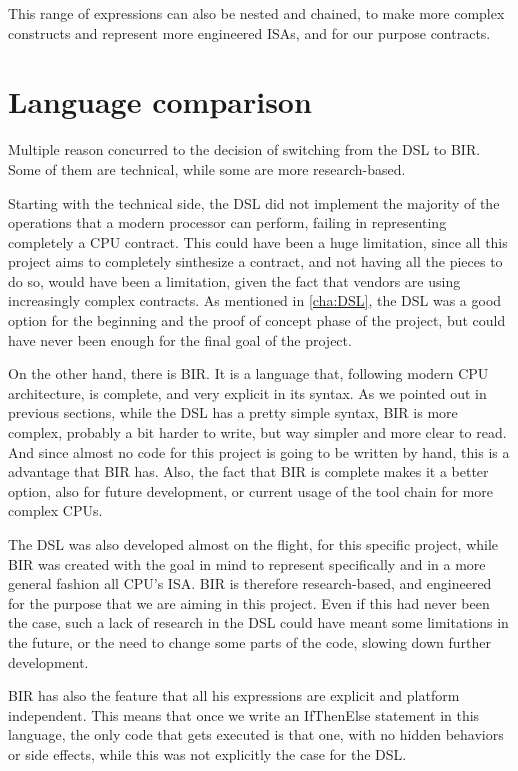 This range of expressions can also be nested and chained, to make more complex
constructs and represent more engineered ISAs, and for our purpose contracts.

\section{Language comparison}
\label{cha:Language comparison} Multiple reason concurred to the decision of switching
from the DSL to BIR. Some of them are technical, while some are more research-based.

Starting with the technical side, the DSL did not implement the majority of the
operations that a modern processor can perform, failing in representing completely
a CPU contract. This could have been a huge limitation, since all this project aims
to completely sinthesize a contract, and not having all the pieces to do so, would
have been a limitation, given the fact that vendors are using increasingly
complex contracts. As mentioned in \cref{cha:DSL}, the DSL was a good option for
the beginning and the proof of concept phase of the project, but could have never
been enough for the final goal of the project.

On the other hand, there is BIR. It is a language that, following modern CPU
architecture, is complete, and very explicit in its syntax. As we pointed out in
previous sections, while the DSL has a pretty simple syntax, BIR is more complex,
probably a bit harder to write, but way simpler and more clear to read. And
since almost no code for this project is going to be written by hand, this is a advantage
that BIR has. Also, the fact that BIR is complete makes it a better option, also
for future development, or current usage of the tool chain for more complex CPUs.

The DSL was also developed almost on the flight, for this specific project, while
BIR was created with the goal in mind to represent specifically and in a more general
fashion all CPU's ISA. BIR is therefore research-based, and engineered for the purpose
that we are aiming in this project. Even if this had never been the case, such a
lack of research in the DSL could have meant some limitations in the future, or
the need to change some parts of the code, slowing down further development.

BIR has also the feature that all his expressions are explicit and platform independent.
This means that once we write an IfThenElse statement in this language, the only
code that gets executed is that one, with no hidden behaviors or side effects, while
this was not explicitly the case for the DSL.

